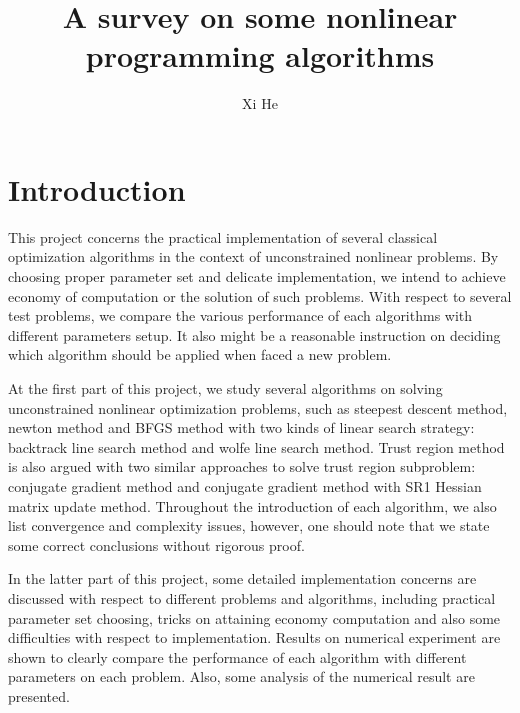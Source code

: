 \documentclass[11pt]{report}
\begin{document}

\title {A survey on some nonlinear programming algorithms}
\author{Xi He}



\preface
\chapter{Introduction}

This project concerns the practical implementation of several classical optimization algorithms in the context of unconstrained nonlinear problems. By choosing proper parameter set and delicate implementation, we intend to achieve economy of computation or the solution of such problems. With respect to several test problems, we compare the various performance of each algorithms with different parameters setup. It also might be a reasonable instruction on deciding which algorithm should be applied when faced a new problem.

At the first part of this project, we study several algorithms on solving unconstrained nonlinear optimization problems, such as steepest descent method, newton method and BFGS method with two kinds of linear search strategy: backtrack line search method and wolfe line search method. Trust region method is also argued with two similar approaches to solve trust region subproblem: conjugate gradient method and conjugate gradient method with SR1 Hessian matrix update method. Throughout the introduction of each algorithm, we also list convergence and complexity issues, however, one should note that we state some correct conclusions without rigorous proof.

In the latter part of this project, some detailed implementation concerns are discussed with respect to different problems and algorithms, including practical parameter set choosing, tricks on attaining economy computation and also some difficulties with respect to implementation. Results on numerical experiment are shown to clearly compare the performance of each algorithm with different parameters on each problem. Also, some analysis of the numerical result are presented.
\end{document}
